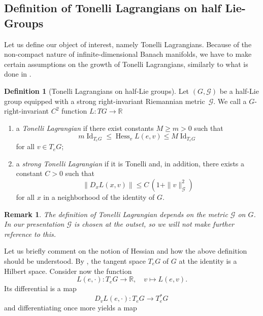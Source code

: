 \documentclass[11pt,reqno]{amsart}
\theoremstyle{plain}
\newtheorem{rem}[thm]{Remark}
\theoremstyle{definition}
\newtheorem{defn}[thm]{Definition}
\theoremstyle{plain} %
\newtheorem{rem}[rem]{Remark}
\theoremstyle{definition} %
\newtheorem{defn}[defn]{Definition}
\numberwithin{equation}{section}
\def\G{\mathcal{G}}
\begin{document}
\subsection{Definition of Tonelli Lagrangians on half Lie-Groups}\label{ss:Definition of Tonelli Lagrangians on half Lie-Groups}
Let us define our object of interest, namely Tonelli Lagrangians. Because of the non-compact nature of infinite-dimensional Banach manifolds, we have to make certain assumptions on the growth of Tonelli Lagrangians, similarly to what is done in \cite{AbbondandoloSchwarz2009}.
\begin{defn}[Tonelli Lagrangians on half-Lie groups]\label{Def: rightv inv Tonelli Langrangian}
  Let $(G, \mathcal{G})$ be a half-Lie group equipped with a strong right-invariant Riemannian metric~$\mathcal{G}$. 
We call a $G$-right-invariant $C^2$ function $L \colon TG \to \mathbb{R}$ 

\begin{enumerate}
    \item a \emph{Tonelli Lagrangian} if there exist constants $M \geq m > 0$ such that
    \begin{equation}\label{eq:uniform convexity}
        m \operatorname{Id}_{T_eG} \leq \operatorname{Hess}_v L(e,v) \leq M \operatorname{Id}_{T_e G}
    \end{equation}
    for all \( v \in T_eG \);
    \item a \emph{strong Tonelli Lagrangian} if it is Tonelli and, in addition, there exists a constant $C > 0$ such that
    \begin{equation}\label{eq: tonelli differential in x}
        \| D_x L(x,v) \| \leq C \, (1+\| v \|_{\mathcal{G}}^2)
    \end{equation}
    for all $x$ in a neighborhood of the identity of $G$.
\end{enumerate}
\end{defn}
\begin{rem}
    The definition of Tonelli Lagrangian depends on the metric $\G$ on $G$. In our presentation \( \mathcal{G} \) is chosen at the outset, so we will not make further reference to this.
\end{rem}
Let us briefly comment on the notion of Hessian and how the above definition should be understood. By \cite[Thm.~7.1]{Bauer_2025}, the tangent space \( T_e G \) of $G$ at the identity is a Hilbert space. 
Consider now the function
\begin{equation*}
    L(e, \cdot) \colon T_e G \to \mathbb{R}, \quad v \mapsto L(e, v).
\end{equation*}
Its differential is a map 
\[
D_v L(e, \cdot) \colon T_e G \to T_e^* G \, 
\] 
and differentiating once more yields a map 
\end{document}
